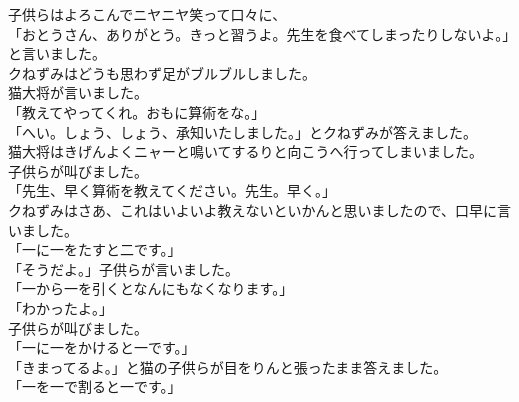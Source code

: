 \documentclass[
    a4paper,
    10pt,
    book]
    {tarticle}
\begin{document}
\newpage
\thispagestyle{fancy}
\fancyhead[R]{\empty}
\indent 子供らはよろこんでニヤニヤ笑って口々に、\\
「おとうさん、ありがとう。きっと習うよ。先生を食べてしまったりしないよ。」と言いました。\\
\indent クねずみはどうも思わず足がブルブルしました。\\
\indent 猫大将が言いました。\\
「教えてやってくれ。おもに算術をな。」\\
「へい。しょう、しょう、承知いたしました。」とクねずみが答えました。\\
\indent 猫大将はきげんよくニャーと鳴いてするりと向こうへ行ってしまいました。\\
\indent 子供らが叫びました。\\
「先生、早く算術を教えてください。先生。早く。」\\
\indent クねずみはさあ、これはいよいよ教えないといかんと思いましたので、口早に言いました。\\
「一に一をたすと二です。」\\
「そうだよ。」子供らが言いました。\\
「一から一を引くとなんにもなくなります。」\\
「わかったよ。」\\
\indent 子供らが叫びました。\\
「一に一をかけると一です。」\\
「きまってるよ。」と猫の子供らが目をりんと張ったまま答えました。\\
「一を一で割ると一です。」
\end{document}

